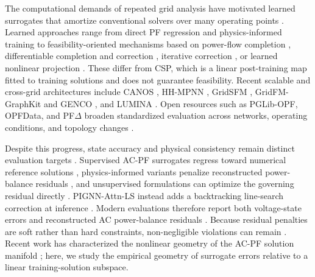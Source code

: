 \documentclass{article}
\begin{document}
The computational demands of repeated grid analysis have motivated learned
surrogates that amortize conventional solvers over many operating points
\cite{lin2024powerflownet,conrad2025data,rivera2025pfdelta}.
Learned approaches range from direct PF regression \cite{lin2024powerflownet}
and physics-informed training \cite{nellikkath2022pinn,wen2026pigat}
to feasibility-oriented mechanisms based on power-flow completion
\cite{pan2020deepopf}, differentiable completion and correction
\cite{donti2021dc3}, iterative correction \cite{kim2026pignn,nguyen2025fsnet},
or learned nonlinear projection \cite{chzhen2026fab}.
These differ from CSP, which is a linear post-training map fitted to training
solutions and does not guarantee feasibility.
Recent scalable and cross-grid architectures include CANOS
\cite{piloto2024canos}, HH-MPNN \cite{arowolo2026hhmpnn}, GridSFM
\cite{yang2026gridsfm}, GridFM-GraphKit and GENCO
\cite{gridfmgraphkit2026,puech2026genco}, and LUMINA
\cite{li2026lumina}.
Open resources such as PGLib-OPF, OPFData, and PF$\Delta$ broaden standardized
evaluation across networks, operating conditions, and topology changes
\cite{babaeinejadsarookolaee2021pglib,lovett2024opfdata,rivera2025pfdelta}.

Despite this progress, state accuracy and physical consistency remain distinct
evaluation targets \cite{nellikkath2022pinn,chevalier2022guarantees}.
Supervised AC-PF surrogates regress toward numerical reference solutions
\cite{lin2024powerflownet}, physics-informed variants penalize reconstructed
power-balance residuals \cite{wen2026pigat}, and unsupervised formulations can
optimize the governing residual directly \cite{jiang2025upinn}.
PIGNN-Attn-LS instead adds a backtracking line-search correction at inference
\cite{kim2026pignn}. Modern evaluations therefore report both voltage-state
errors and reconstructed AC power-balance residuals
\cite{wen2026pigat,puech2026genco}. Because residual penalties are soft rather
than hard constraints, non-negligible violations can remain
\cite{donti2021dc3,nguyen2025fsnet}.
Recent work has characterized the nonlinear geometry of the AC-PF solution
manifold \cite{goodwin2026geometry}; here, we study the empirical geometry of
surrogate errors relative to a linear training-solution subspace.
\end{document}

